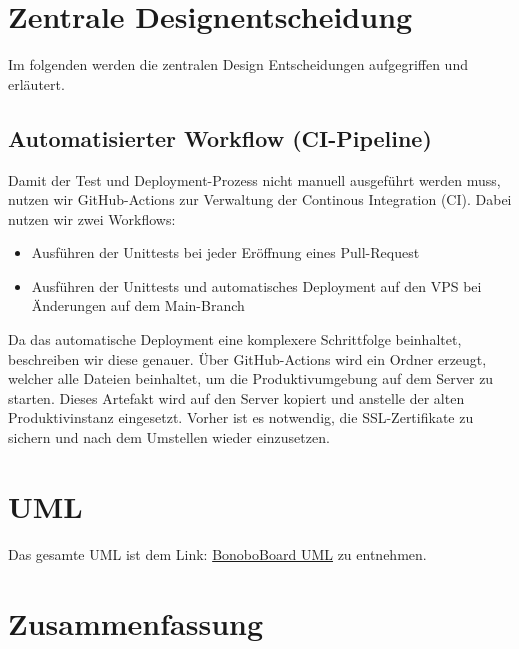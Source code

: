 \documentclass[a4paper,11pt]{scrartcl}
\begin{document}
\section{Zentrale Designentscheidung}
Im folgenden werden die zentralen Design Entscheidungen aufgegriffen und erläutert.
	\subsection{Automatisierter Workflow (CI-Pipeline)} \label{ci}
Damit der Test und Deployment-Prozess nicht manuell ausgeführt werden muss, nutzen wir GitHub-Actions zur Verwaltung der Continous Integration (CI).
Dabei nutzen wir zwei Workflows:
\begin{itemize}
	\item Ausführen der Unittests bei jeder Eröffnung eines Pull-Request
	\item Ausführen der Unittests und automatisches Deployment auf den VPS bei Änderungen auf dem Main-Branch
\end{itemize}
Da das automatische Deployment eine komplexere Schrittfolge beinhaltet, beschreiben wir diese genauer.
Über GitHub-Actions wird ein Ordner erzeugt, welcher alle Dateien beinhaltet, um die Produktivumgebung auf dem Server zu starten. Dieses Artefakt wird auf den Server kopiert und anstelle der alten Produktivinstanz eingesetzt. Vorher ist es notwendig, die SSL-Zertifikate zu sichern und nach dem Umstellen wieder einzusetzen.

\section{UML}
Das gesamte UML ist dem Link: \href{https://raw.githubusercontent.com/Software-Engineering-DHBW/BonoboBoard/main/documents/img/BonoboUML.drawio.svg}{BonoboBoard UML} zu entnehmen. 

\section{Zusammenfassung}



\end{document}
